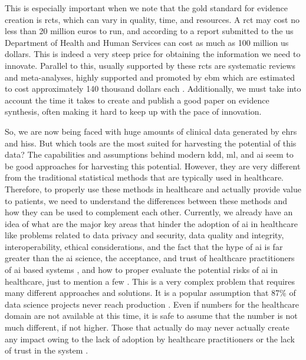 This is especially important when we note that the gold standard for evidence creation is \acp{rct}, which can vary in quality, time, and resources. A \ac{rct} may cost no less than 20 million euros to run, and according to a report submitted to the \ac{us} Department of Health and Human Services \cite{sertkayaaylinEXAMINATIONCLINICALTRIAL2014} can cost as much as 100 million \ac{us} dollars. This is indeed a very steep price for obtaining the information we need to innovate. Parallel to this, usually supported by these \acp{rct} are systematic reviews and meta-analyses, highly supported and promoted by \ac{ebm} which are estimated to cost approximately 140 thousand dollars each \cite{michelsonSignificantCostSystematic2019}. Additionally, we must take into account the time it takes to create and publish a good paper on evidence synthesis, often making it hard to keep up with the pace of innovation.

So, we are now being faced with huge amounts of clinical data generated by \acp{ehr} and \acp{his}. But which tools are the most suited for harvesting the potential of this data? 
The capabilities and assumptions behind modern \ac{kdd}, \ac{ml}, and \ac{ai} seem to be good approaches for harvesting this potential. However, they are very different from the traditional statistical methods that are typically used in healthcare.
Therefore, to properly use these methods in healthcare and actually provide value to patients, we need to understand the differences between these methods and how they can be used to complement each other.
Currently, we already have an idea of what are the major key areas that hinder the adoption of \ac{ai} in healthcare like problems related to data privacy and security, data quality and integrity, interoperability, ethical considerations, and the fact that the hype of \ac{ai} is far greater than the \ac{ai} science, the acceptance, and trust of healthcare practitioners of \ac{ai} based systems \cite{muhiyaddinImpactClinicalDecision2020,kilsdonkFactorsInfluencingImplementation2017}, and how to proper evaluate the potential risks of \ac{ai} in healthcare, just to mention a few \cite{topolHighperformanceMedicineConvergence2019a}.
This is a very complex problem that requires many different approaches and solutions. It is a popular assumption that 87\% of data science projects never reach production \cite{Why87Data2019}. Even if numbers for the healthcare domain are not available at this time, it is safe to assume that the number is not much different, if not higher. Those that actually do may never actually create any impact owing to the lack of adoption by healthcare practitioners or the lack of trust in the system \cite{walkerModelGuidedDecisionMakingThromboprophylaxis2023}.

